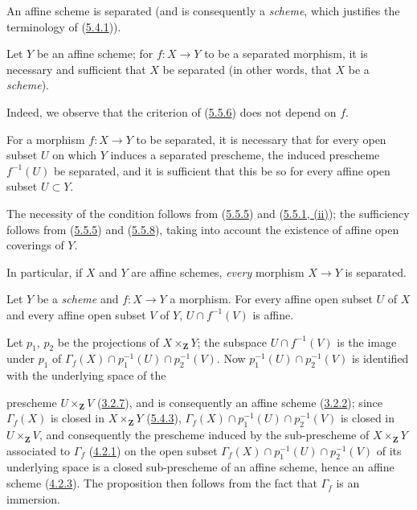 \begin{corollary}[5.5.7]
\label{I.5.5.7}
An affine scheme is separated \textup{(and is consequently a \emph{scheme}, which justifies
the terminology of \textup{(\hyperref[I.5.4.1]{5.4.1})})}.
\end{corollary}

\begin{corollary}[5.5.8]
\label{I.5.5.8}
Let $Y$ be an affine scheme; for $f:X\to Y$ to be a separated morphism, it
is necessary and sufficient that $X$ be separated \textup{(in other words, that $X$
be a \emph{scheme})}.
\end{corollary}

Indeed, we observe that the criterion of
(\hyperref[I.5.5.6]{5.5.6}) does not depend on $f$.

\begin{corollary}[5.5.9]
\label{I.5.5.9}
For a morphism $f:X\to Y$ to be separated, it is necessary that for every
open subset $U$ on which $Y$ induces a separated prescheme, the induced
prescheme $f^{-1}(U)$ be separated, and it is sufficient that this be so for
every affine open subset $U\subset Y$.
\end{corollary}

The necessity of the condition follows from
(\hyperref[I.5.5.5]{5.5.5}) and
(\hyperref[I.5.5.1]{5.5.1, (ii)}); the sufficiency follows from
(\hyperref[I.5.5.5]{5.5.5}) and
(\hyperref[I.5.5.8]{5.5.8}), taking into account the existence of affine
open coverings of $Y$.

In particular, if $X$ and $Y$ are affine schemes, \emph{every} morphism
$X\to Y$ is separated.

\begin{proposition}[5.5.10]
\label{I.5.5.10}
Let $Y$ be a \emph{scheme} and $f:X\to Y$ a morphism. For every affine open subset
$U$ of $X$ and every affine open subset $V$ of $Y$, $U\cap f^{-1}(V)$ is
affine.
\end{proposition}

Let $p_1$, $p_2$ be the projections of $X\times_{\mathbf{Z}}Y$; the
subspace $U\cap f^{-1}(V)$ is the image under $p_1$ of
$\Gamma_f(X)\cap p_1^{-1}(U)\cap p_2^{-1}(V)$. Now
$p_1^{-1}(U)\cap p_2^{-1}(V)$ is identified with the underlying space of the

prescheme $U\times_{\mathbf{Z}}V$
(\hyperref[I.3.2.7]{3.2.7}), and is consequently an affine scheme
(\hyperref[I.3.2.2]{3.2.2}); since $\Gamma_f(X)$ is closed in
$X\times_{\mathbf{Z}}Y$ (\hyperref[I.5.4.3]{5.4.3}),
$\Gamma_f(X)\cap p_1^{-1}(U)\cap p_2^{-1}(V)$ is closed in
$U\times_{\mathbf{Z}}V$, and consequently the prescheme induced by the
sub-prescheme of $X\times_{\mathbf{Z}}Y$ associated to $\Gamma_f$
(\hyperref[I.4.2.1]{4.2.1}) on the open subset
$\Gamma_f(X)\cap p_1^{-1}(U)\cap p_2^{-1}(V)$ of its underlying space is
a closed sub-prescheme of an affine scheme, hence an affine scheme
(\hyperref[I.4.2.3]{4.2.3}). The proposition then follows from the fact
that $\Gamma_f$ is an immersion.

